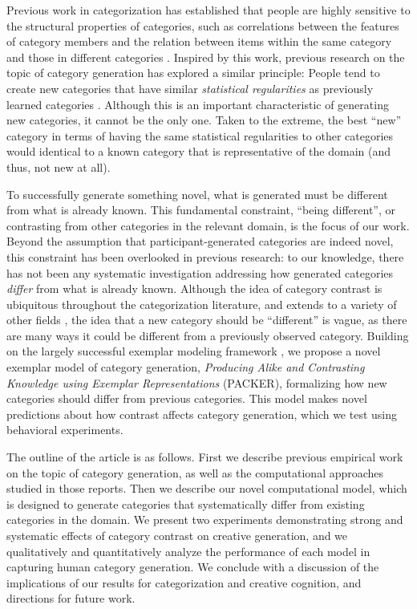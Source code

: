 \documentclass[12pt]{article}
\begin{document}
\begin{flushleft}
Previous work in categorization has established that people are highly sensitive to the structural properties of categories, such as correlations between the features of category members and the relation between items within the same category and those in different categories \citep{roschmervis1975,regier2007,shepard1961learning}. Inspired by this work, previous research on the topic of category generation has explored a similar principle: People tend to create new categories that have similar {\em statistical regularities} as previously learned categories \citep{jern2013probabilistic,ward1994structured}. Although this is an important characteristic of generating new categories, it cannot be the only one. Taken to the extreme, the best ``new'' category in terms of having the same statistical regularities to other categories would identical to a known category that is representative of the domain (and thus, not new at all). 

To successfully generate something novel, what is generated must be different from what is already known. This fundamental constraint, ``being different'', or contrasting from other categories in the relevant domain, is the focus of our work. Beyond the assumption that participant-generated categories are indeed novel, this constraint has been overlooked in previous research: to our knowledge, there has not been any systematic investigation addressing how generated categories {\em differ} from what is already known. Although the idea of category contrast is ubiquitous throughout the categorization literature, and extends to a variety of other fields \citep[e.g., color;][]{regier2007}, the idea that a new category should be ``different'' is vague, as there are many ways it could be different from a previously observed category. Building on the largely successful exemplar modeling framework \citep{medin1978context,nosofsky1984choice,nosofsky1986attention}, we propose a novel exemplar model of category generation, {\em Producing Alike and Contrasting Knowledge using Exemplar Representations} (PACKER), formalizing how new categories should differ from previous categories. This model makes novel predictions about how contrast affects category generation, which we test using behavioral experiments.

The outline of the article is as follows. First we describe previous empirical work on the topic of category generation, as well as the computational approaches studied in those reports. Then we describe our novel computational model, which is designed to generate categories that systematically differ from existing categories in the domain. We present two experiments demonstrating strong and systematic effects of category contrast on creative generation, and we qualitatively and quantitatively analyze the performance of each model in capturing human category generation. We conclude with a discussion of the implications of our results for categorization and creative cognition, and directions for future work.


\end{flushleft}
\end{document}

